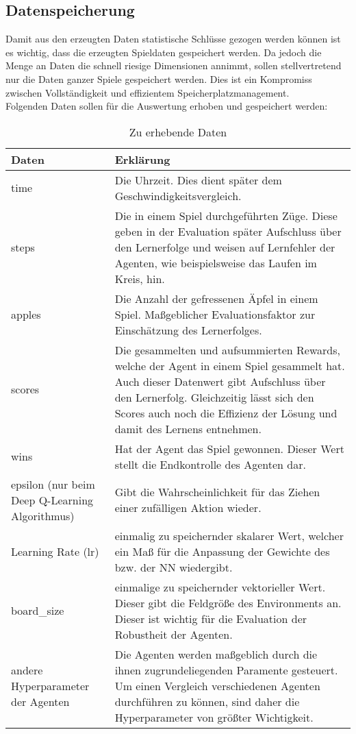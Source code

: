 \subsection{Datenspeicherung}
Damit aus den erzeugten Daten statistische Schlüsse gezogen werden können ist es wichtig, dass die erzeugten Spieldaten gespeichert werden. Da jedoch die Menge an Daten die schnell riesige Dimensionen annimmt, sollen stellvertretend nur die Daten ganzer Spiele gespeichert werden. Dies ist ein Kompromiss zwischen Vollständigkeit und effizientem Speicherplatzmanagement.\\
Folgenden Daten sollen für die Auswertung erhoben und gespeichert werden:
\begin{longtable}[h]{|p{4cm}|p{\linewidth - 5cm}|}
	\caption{Zu erhebende Daten}
	\label{tab:Datenerhebung} 
	\endfirsthead
	\endhead
	\hline
	Daten & Erklärung \\
	\hline
	time & Die Uhrzeit. Dies dient später dem Geschwindigkeitsvergleich. \\
	\hline
	steps & Die in einem Spiel durchgeführten Züge. Diese geben in der Evaluation später Aufschluss über den Lernerfolge und weisen auf Lernfehler der Agenten, wie beispielsweise das Laufen im Kreis, hin. \\
	\hline
	apples & Die Anzahl der gefressenen Äpfel in einem Spiel. Maßgeblicher Evaluationsfaktor zur Einschätzung des Lernerfolges. \\
	\hline
	scores & Die gesammelten und aufsummierten Rewards, welche der Agent in einem Spiel gesammelt hat. Auch dieser Datenwert gibt Aufschluss über den Lernerfolg. Gleichzeitig lässt sich den Scores auch noch die Effizienz der Lösung und damit des Lernens entnehmen. \\
	\hline
	wins & Hat der Agent das Spiel gewonnen. Dieser Wert stellt die Endkontrolle des Agenten dar. \\
	\hline
	epsilon (nur beim Deep Q-Learning Algorithmus) & Gibt die Wahrscheinlichkeit für das Ziehen einer zufälligen Aktion wieder.  \\
	\hline
	Learning Rate (lr) & einmalig zu speichernder skalarer Wert, welcher ein Maß für die Anpassung der Gewichte des bzw. der NN wiedergibt. \\
	\hline
	board\_size &  einmalige zu speichernder vektorieller Wert. Dieser gibt die Feldgröße des Environments an. Dieser ist wichtig für die Evaluation der Robustheit der Agenten. \\
	\hline
	andere Hyperparameter der Agenten & Die Agenten werden maßgeblich durch die ihnen zugrundeliegenden Paramente gesteuert. Um einen Vergleich verschiedenen Agenten durchführen zu können, sind daher die Hyperparameter von größter Wichtigkeit. \\
	\hline
\end{longtable}

